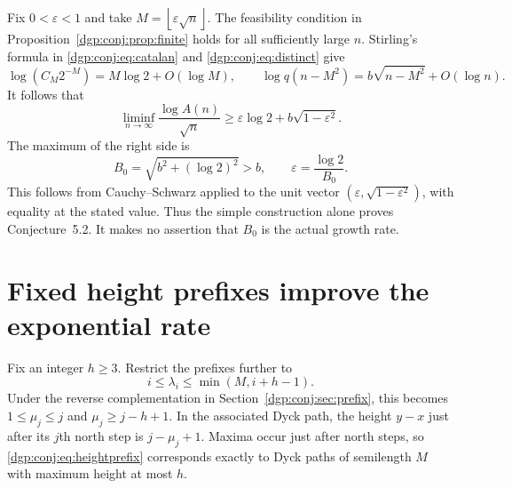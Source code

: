 \documentclass[11pt,letterpaper]{article}
\numberwithin{equation}{section}
\theoremstyle{remark}\newtheorem{remark}[theorem]{Remark}
\newcommand{\floor}[1]{\left\lfloor #1\right\rfloor}
\begin{document}
Fix $0<\varepsilon<1$ and take $M=\floor{\varepsilon\sqrt n}$.
The feasibility condition in Proposition~\ref{dgp:conj:prop:finite} holds
for all sufficiently large $n$. Stirling's formula in
\eqref{dgp:conj:eq:catalan} and \eqref{dgp:conj:eq:distinct} give
\[
 \log(C_M2^{-M})=M\log2+O(\log M),\qquad
 \log q(n-M^2)=b\sqrt{n-M^2}+O(\log n).
\]
It follows that
\begin{equation}\label{dgp:conj:eq:baselineepsilon}
 \liminf_{n\to\infty}\frac{\log A(n)}{\sqrt n}
 \geq\varepsilon\log2+b\sqrt{1-\varepsilon^2}.
\end{equation}
The maximum of the right side is
\begin{equation}\label{dgp:conj:eq:baseline}
 B_0=\sqrt{b^2+(\log2)^2}>b,
 \qquad\varepsilon=\frac{\log2}{B_0}.
\end{equation}
This follows from Cauchy--Schwarz applied to the unit vector
$(\varepsilon,\sqrt{1-\varepsilon^2})$, with equality at the
stated value. Thus the simple construction alone proves
Conjecture~5.2. It makes no assertion that $B_0$ is the actual
growth rate.

\section{Fixed height prefixes improve the exponential rate}\label{dgp:conj:sec:height}
Fix an integer $h\geq3$. Restrict the prefixes further to
\begin{equation}\label{dgp:conj:eq:heightprefix}
 i\leq\lambda_i\leq\min(M,i+h-1).
\end{equation}
Under the reverse complementation in Section~\ref{dgp:conj:sec:prefix},
this becomes $1\leq\mu_j\leq j$ and $\mu_j\geq j-h+1$.
In the associated Dyck path, the height $y-x$ just after its $j$th
north step is $j-\mu_j+1$. Maxima occur just after north steps,
so \eqref{dgp:conj:eq:heightprefix} corresponds exactly to Dyck paths of
semilength $M$ with maximum height at most $h$.
\end{document}
